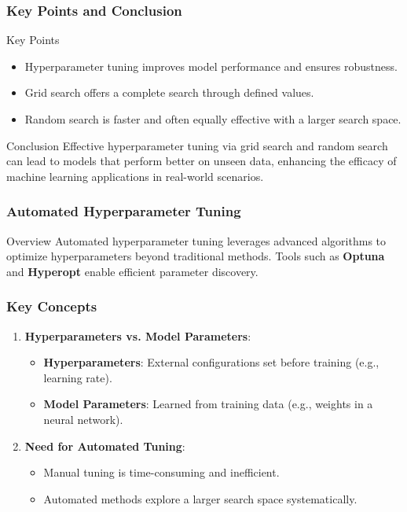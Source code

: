 \documentclass[aspectratio=169]{beamer}
\begin{document}
\begin{frame}[fragile]
    \frametitle{Key Points and Conclusion}
    \begin{block}{Key Points}
        \begin{itemize}
            \item Hyperparameter tuning improves model performance and ensures robustness.
            \item Grid search offers a complete search through defined values.
            \item Random search is faster and often equally effective with a larger search space.
        \end{itemize}
    \end{block}

    \begin{block}{Conclusion}
        Effective hyperparameter tuning via grid search and random search can lead to models that perform better on unseen data, enhancing the efficacy of machine learning applications in real-world scenarios.
    \end{block}
\end{frame}

\begin{frame}[fragile]
    \frametitle{Automated Hyperparameter Tuning}
    \begin{block}{Overview}
        Automated hyperparameter tuning leverages advanced algorithms to optimize hyperparameters beyond traditional methods. Tools such as \textbf{Optuna} and \textbf{Hyperopt} enable efficient parameter discovery.
    \end{block}
\end{frame}

\begin{frame}[fragile]
    \frametitle{Key Concepts}
    \begin{enumerate}
        \item \textbf{Hyperparameters vs. Model Parameters}:
        \begin{itemize}
            \item \textbf{Hyperparameters}: External configurations set before training (e.g., learning rate).
            \item \textbf{Model Parameters}: Learned from training data (e.g., weights in a neural network).
        \end{itemize}
        
        \item \textbf{Need for Automated Tuning}:
        \begin{itemize}
            \item Manual tuning is time-consuming and inefficient.
            \item Automated methods explore a larger search space systematically.
        \end{itemize}
    \end{enumerate}
\end{frame}
\end{document}

